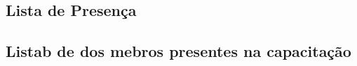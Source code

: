 \begin{anexosenv}
\partanexos
\chapter{Lista de Presença}
\par
\section{Listab de dos mebros presentes na capacitação}

\end{anexosenv}